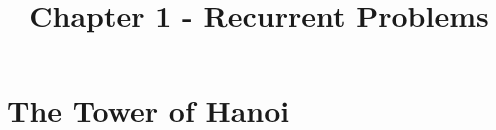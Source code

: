 \documentclass{article}
\title{Chapter 1 - Recurrent Problems}
\date{}
\author{}
\begin{document}
\maketitle

\section*{The Tower of Hanoi}
\end{document}
